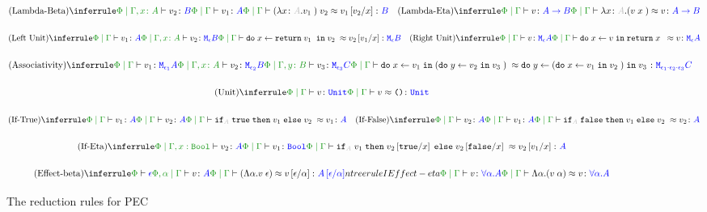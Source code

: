 \documentclass{Report}
\begin{document}
\begin{figure}[h!]
    
    \begin{framed}
        \[
            \scalebox{0.8}{$
            \ntreeruleII{Lambda-Beta}{\etyperelation{\P}{\gax}{v_2}{B}}{\gpetyperelation{v_1}{A}}{\gpeberelation{\apply{(\lam{x}{A}{v_1})}{v_2} }{ v_1\ssub{x}{v_2}}{B}}
            \quad
            \ntreeruleI{Lambda-Eta}{\gpetyperelation{v}{\ab}}{\gpeberelation{\lam{x}{A}{(\apply{v}{x}})}{v}{\ab}}
            $}
        \]
    
        \[\scalebox{0.8}{$
            \ntreeruleII{Left Unit}{\gpetyperelation{v_1}{A} }{ \etyperelation{\P}{\gax}{v_2}{\meb}}{\gpeberelation{\doin{x}{\return{v_1}}{v_2}}{v_2\ssub{x}{v_1}}{\meb}}
            \quad
            \ntreeruleI{Right Unit}{\gpetyperelation{v}{\mea}}{\gpeberelation{\doin{x}{v}{\return{x}} }{v}{\mea}}
        $}\]
    
        \[\scalebox{0.8}{$
            \ntreeruleIII{Associativity}{\gpetyperelation{v_1}{\M{\e_1}{A}} }{\etyperelation{\P}{\gax}{v_2}{\M{\e_2}{B}}}{ \etyperelation{\P}{\gby}{v_3}{\M{\e_3}{C}}}{
                \gpeberelation{\doin{x}{v_1}{(\doin{y}{v_2}{v_3})}}{\doin{y}{(\doin{x}{v_1}{v_2})}{v_3}}{\M{\e_1 \dot \e_2 \dot \e_3}{C}}
            }
        $}\]
    
        \[\scalebox{0.8}{$
            \ntreeruleI{Unit}{\gpetyperelation{v}{\U}}{\gpeberelation{v}{\u}{\U}}
        $}\]
    
        \[\scalebox{0.8}{$
            \ntreeruleII{If-True}{\gpetyperelation{v_1}{A}}{\gpetyperelation{v_2}{A}}{\gpeberelation{\pifthenelse{A}{\t}{v_1}{v_2}}{v_1}{A}}
            \quad
            \ntreeruleII{If-False}{\gpetyperelation{v_2}{A}}{\gpetyperelation{v_1}{A}}{\gpeberelation{\pifthenelse{A}{\f}{v_1}{v_2}}{v_2}{A}}    
        $}\]
    
        \[\scalebox{0.8}{$
            \ntreeruleII{If-Eta}{\etyperelation{\P}{\G, x: \B}{v_2}{A}}{\gpetyperelation{v_1}{\B}}{\gpeberelation{\pifthenelse{A}{v_1}{v_2\ssub{x}{\t}}{v_2\ssub{x}{\f}}}{v_2\ssub{x}{v_1}}{A}}
        $}\]
    
        \[\scalebox{0.8}{$
            \ntreeruleII{Effect-beta}{\wellformed{\P}{\e}}{\etyperelation{\P, \a}{\G}{v}{A}}{\gpeberelation{\eapp{(\elam{\a}{v}}{\e})}{v\ssub{\a}{\e}}{A\ssub{\a}{\e}}}
            \quad 
            \\ntreeruleI{Effect-eta}{\etyperelation{\P}{\G}{v}{\all{\a}{A}}}{\gpeberelation{\elam{\a}{(\eapp{v}{\a})}}{v}{\all{\a}{A}}}
        $}\]
    \end{framed}
    \caption{The reduction rules for PEC}
    \label{BetaEtaReductions}
\end{figure}
\end{document}
